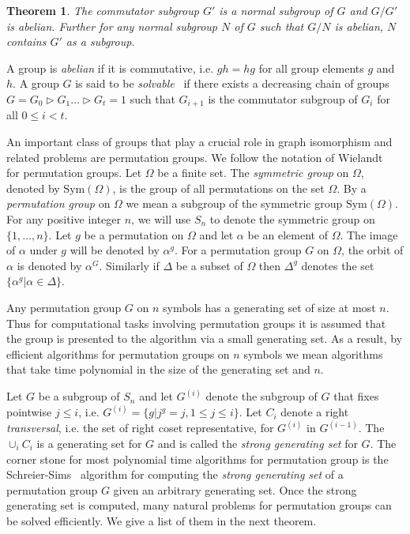 \documentclass[a4paper,11pt]{article}
\newtheorem{theorem}{Theorem}[section]
\newcommand{\Sym}[1]{\ensuremath{\mathrm{Sym}\left(#1\right)}}
\begin{document}
\begin{theorem}
The commutator subgroup $G'$ is a normal subgroup of $G$ and $G/G'$ is
abelian. Further for any normal subgroup $N$ of $G$ such that $G/N$ is
abelian, $N$ contains $G'$ as a subgroup.
\end{theorem}

A group is \emph{abelian} if it is commutative, i.e. $g h = hg$ for
all group elements $g$ and $h$. A group $G$ is said to be
\emph{solvable}~\cite[Page 138]{hall} if there exists a decreasing
chain of groups $G = G_0 \rhd G_1 \ldots \rhd G_t = 1$ such that
$G_{i+1}$ is the commutator subgroup of $G_i$ for all $0 \leq i < t$.

An important class of groups that play a crucial role in graph
isomorphism and related problems are permutation groups. We follow the
notation of Wielandt~\cite{wielandt64finite} for permutation groups.
Let $\Omega$ be a finite set. The \emph{symmetric group} on $\Omega$,
denoted by $\Sym{\Omega}$, is the group of all permutations on the set
$\Omega$.  By a \emph{permutation group} on $\Omega$ we mean a
subgroup of the symmetric group $\Sym{\Omega}$. For any positive
integer $n$, we will use $S_n$ to denote the symmetric group on
$\{1,\ldots, n\}$. Let $g$ be a permutation on $\Omega$ and let
$\alpha$ be an element of $\Omega$. The image of $\alpha$ under $g$
will be denoted by $\alpha^g$. For a permutation group $G$ on
$\Omega$, the orbit of $\alpha$ is denoted by $\alpha^G$. Similarly if
$\Delta$ be a subset of $\Omega$ then $\Delta^g$ denotes the set $\{
\alpha^g | \alpha \in \Delta \}$.

Any permutation group $G$ on $n$ symbols has a generating set of size
at most $n$. Thus for computational tasks involving permutation groups
it is assumed that the group is presented to the algorithm via a small
generating set. As a result, by efficient algorithms for permutation
groups on $n$ symbols we mean algorithms that take time polynomial in
the size of the generating set and $n$.

Let $G$ be a subgroup of $S_n$ and let $G^{(i)}$ denote the subgroup
of $G$ that fixes pointwise $j \leq i$, i.e. $G^{(i)} = \{ g | j^g =
j, 1 \leq j \leq i \}$. Let $C_i$ denote a right \emph{transversal},
i.e.  the set of right coset representative, for $G^{(i)}$ in
$G^{(i-1)}$. The $\cup_i C_i$ is a generating set for $G$ and is
called the \emph{strong generating set} for $G$. The corner stone for
most polynomial time algorithms for permutation group is the
Schreier-Sims~\cite{sims70computational,sims78some,furst80polynomialtime}
algorithm for computing the \emph{strong generating set} of a
permutation group $G$ given an arbitrary generating set. Once the
strong generating set is computed, many natural problems for
permutation groups can be solved efficiently. We give a list of them
in the next theorem.
\end{document}
